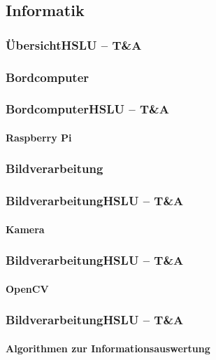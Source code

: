 \subsection{Informatik}

\author{Alexander Suter}

\begin{frame}
	\frametitle{Übersicht\hfill{}\footnotesize HSLU -- T\&A}

\end{frame}

\subsubsection{Bordcomputer}
\begin{frame}
	\frametitle{Bordcomputer\hfill{}\footnotesize HSLU -- T\&A}
	\framesubtitle{Raspberry Pi}
\end{frame}

\subsubsection{Bildverarbeitung}
\begin{frame}
	\frametitle{Bildverarbeitung\hfill{}\footnotesize HSLU -- T\&A}
	\framesubtitle{Kamera}
\end{frame}

\begin{frame}
	\frametitle{Bildverarbeitung\hfill{}\footnotesize HSLU -- T\&A}
	\framesubtitle{OpenCV}
\end{frame}

\begin{frame}
	\frametitle{Bildverarbeitung\hfill{}\footnotesize HSLU -- T\&A}
	\framesubtitle{Algorithmen zur Informationsauswertung}
\end{frame}
